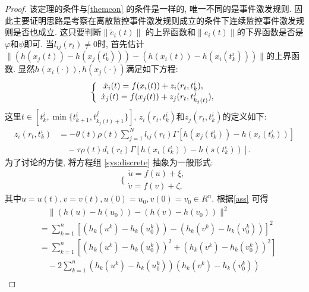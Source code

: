         \begin{proof}
        该定理的条件与\autoref{themcon} 的条件是一样的, 唯一不同的是事件激发规则. 因此主要证明思路是考察在离散监控事件激发规则成立的条件下连续监控事件激发规则是否也成立. 这只要判断$\|\tilde{e}_i(t)\|$ 的上界函数和$\|e_i(t)\|$的下界函数是否是$\varphi$和$\psi$即可. 当$l_{ij}(r_t)\neq 0$时, 首先估计$\|(h(x_j(t))-h(x_j(t^i_k)))-(h(x_i(t))-h(x_i(t^i_k)))\|$的上界函数. 显然$h(x_i(\cdot)),h(x_j(\cdot))$满足如下方程:
            \begin{equation}\label{sys:discrete}
                \bigg\{\begin{array}{c}
                    \dot{x}_i(t)=f(x_i(t))+z_i(r_t,t^i_k), \quad    \\
                    \dot{x}_j(t)=f(x_j(t))+z_j(r_t,t^j_{k_j(t)}),
                \end{array}\\
            \end{equation}
       这里$t\in[t^i_k, \min\{ t^i_{k+1}, t^j_{k_j(t)+1}\}]$,
       $z_i(r_t,t^i_k)$和$z_j(r_t,t^i_k)$的定义如下:
        \begin{align}\label{zi}
        \nonumber z_\iota(r_t,t^\iota_k)&=-\theta(t)\rho(t)\sum^N_{j=1}l_{\iota j}(r_{t})\Gamma[h(x_{j}(t_{k}^{\iota}))-h(x_{\iota }(t_{k}^{\iota}))]\\
        &\quad-\tau\rho(t)d_{\iota}(r_{t})\Gamma[h(x_{\iota}(t_{k}^{\iota}))-h(s(t_{k}^{\iota}))].
        \end{align}
        为了讨论的方便, 将方程组 \eqref{sys:discrete} 抽象为一般形式:
            \begin{equation}\label{sys:dis-gener}
                \bigg\{\begin{array}{c}
                    \dot{u}=f(u)+\xi,   \\
                    \dot{v}=f(v)+\zeta,
                \end{array}
            \end{equation}
       其中$u=u(t),v=v(t),u(0)=u_0,v(0)=v_0\in R^n$.
        根据\autoref{ass} 可得
            \begin{align}\label{equ:12}
            \nonumber&\quad\|(h(u)-h(u_0))-(h(v)-h(v_0))\|^2\\
            \nonumber &=\sum^n_{k=1}[ (h_k(u^k)-h_k(u^k_0))-(h_k(v^k)-h_k(v^k_0))]^2\\
            \nonumber &=\sum^n_{k=1}[(h_k(u^k)-h_k(u^k_0))^2+(h_k(v^k)-h_k(v^k_0))^2]\\
            \nonumber &\quad-2\sum^n_{k=1}(h_k(u^k)-h_k(u^k_0))(h_k(v^k)-h_k(v^k_0)) \\

\end{align}
\end{proof}
